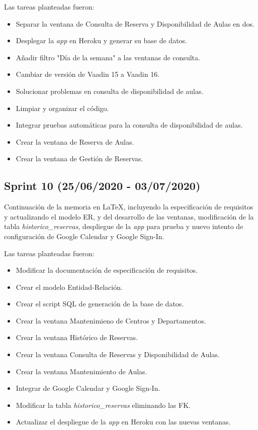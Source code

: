 Las tareas planteadas fueron:
\begin{itemize}
\tightlist
    \item Separar la ventana de Consulta de Reserva y Disponibilidad de Aulas en dos.
    \item Desplegar la \textit{app} en Heroku y generar su base de datos.
    \item Añadir filtro "Día de la semana" a las ventanas de consulta.
    \item Cambiar de versión de Vaadin 15 a Vaadin 16.
    \item Solucionar problemas en consulta de disponibilidad de aulas.
    \item Limpiar y organizar el código.
    \item Integrar pruebas automáticas para la consulta de disponibilidad de aulas.
    \item Crear la ventana de Reserva de Aulas.
    \item Crear la ventana de Gestión de Reservas.
\end{itemize}

\subsection{Sprint 10 (25/06/2020 - 03/07/2020)}
Continuación de la memoria en \LaTeX, incluyendo la especificación de requisitos y actualizando el modelo ER, y del desarrollo de las ventanas, modificación de la tabla \textit{historico\_reservas}, despliegue de la \textit{app} para prueba y nuevo intento de configuración de Google Calendar y Google Sign-In.

Las tareas planteadas fueron:
\begin{itemize}
\tightlist
    \item Modificar la documentación de especificación de requisitos.
    \item Crear el modelo Entidad-Relación.
    \item Crear el script SQL de generación de la base de datos.
    \item Crear la ventana Mantenimieno de Centros y Departamentos.
    \item Crear la ventana Histórico de Reservas.
    \item Crear la ventana Consulta de Reservas y Disponibilidad de Aulas.
    \item Crear la ventana Mantenimiento de Aulas.
    \item Integrar de Google Calendar y Google Sign-In.
    \item Modificar la tabla \textit{historico\_reservas} eliminando las FK.
    \item Actualizar el despliegue de la \textit{app} en Heroku con las nuevas ventanas.
\end{itemize}

